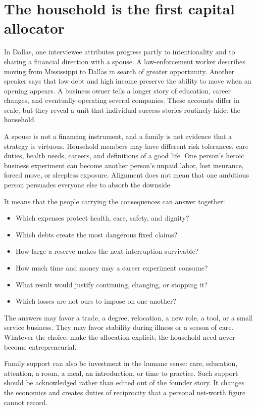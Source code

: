 \section{The household is the first capital allocator}

In Dallas, one interviewee attributes progress partly to intentionality and to
sharing a financial direction with a spouse. A law-enforcement worker describes
moving from Mississippi to Dallas in search of greater opportunity. Another
speaker says that low debt and high income preserve the ability to move when an
opening appears. A business owner tells a longer story of education, career
changes, and eventually operating several companies. These accounts differ in
scale, but they reveal a unit that individual success stories routinely hide:
the household.

A spouse is not a financing instrument, and a family is not evidence that a
strategy is virtuous. Household members may have different risk tolerances,
care duties, health needs, careers, and definitions of a good life. One
person's heroic business experiment can become another person's unpaid labor,
lost insurance, forced move, or sleepless exposure. Alignment does not mean
that one ambitious person persuades everyone else to absorb the downside.

It means that the people carrying the consequences can answer together:

\begin{itemize}
\item Which expenses protect health, care, safety, and dignity?
\item Which debts create the most dangerous fixed claims?
\item How large a reserve makes the next interruption survivable?
\item How much time and money may a career experiment consume?
\item What result would justify continuing, changing, or stopping it?
\item Which losses are not ours to impose on one another?
\end{itemize}

The answers may favor a trade, a degree, relocation, a new role, a tool, or a
small service business. They may favor stability during illness or a season of
care. Whatever the choice, make the allocation explicit; the household need
never become entrepreneurial.

Family support can also be investment in the humane sense: care, education,
attention, a room, a meal, an introduction, or time to practice. Such support
should be acknowledged rather than edited out of the founder story. It changes
the economics and creates duties of reciprocity that a personal net-worth
figure cannot record.

